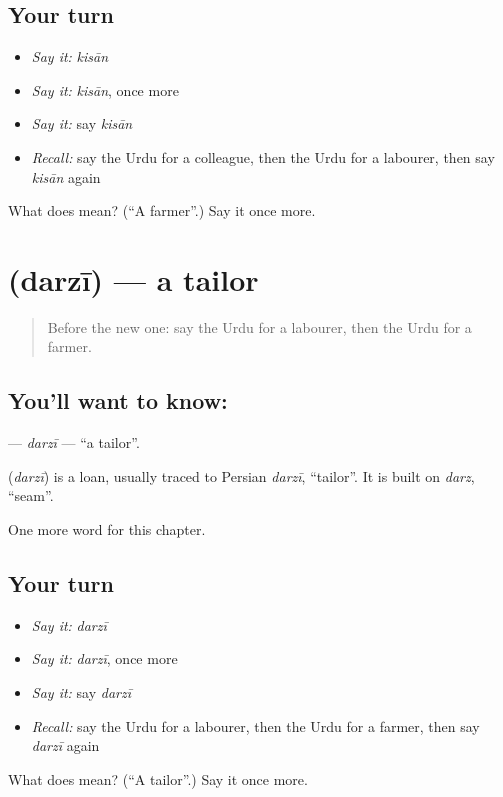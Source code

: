 \subsection*{Your turn}
\begin{itemize}
\raggedright
  \item \emph{Say it:} \emph{kisān}
  \item \emph{Say it:} \emph{kisān}, once more
  \item \emph{Say it:} say \emph{kisān}
  \item \emph{Recall:} say the Urdu for a colleague, then the Urdu for a labourer, then say \emph{kisān} again
\end{itemize}

\begin{tcolorbox}[breakable,colback=teal!4,colframe=teal!35!black,title={Before you move on}]
What does  mean? (\textquotedblleft{}A farmer\textquotedblright{}.) Say it once more.
\end{tcolorbox}
\section[\texorpdfstring{\ur{درزی} (darzī)}{درزی (darzī)}]{ (darzī) — a tailor}

\label{lesson:UR-C177-darzi}



\begin{quote}
Before the new one: say the Urdu for a labourer, then the Urdu for a farmer.
\end{quote}

\subsection*{You'll want to know: }
\textbf{} — \emph{darzī} — \textquotedblleft{}a tailor\textquotedblright{}.

\begin{cousinweb}
\textbf{} (\emph{darzī}) is a loan, usually traced to Persian \emph{darzī}, \textquotedblleft{}tailor\textquotedblright{}. It is built on \emph{darz}, \textquotedblleft{}seam\textquotedblright{}.
\end{cousinweb}

\begin{grammarlens}[title={What you've built}]
One more word for this chapter.
\end{grammarlens}

\subsection*{Your turn}
\begin{itemize}
\raggedright
  \item \emph{Say it:} \emph{darzī}
  \item \emph{Say it:} \emph{darzī}, once more
  \item \emph{Say it:} say \emph{darzī}
  \item \emph{Recall:} say the Urdu for a labourer, then the Urdu for a farmer, then say \emph{darzī} again
\end{itemize}

\begin{tcolorbox}[breakable,colback=teal!4,colframe=teal!35!black,title={Before you move on}]
What does  mean? (\textquotedblleft{}A tailor\textquotedblright{}.) Say it once more.
\end{tcolorbox}
